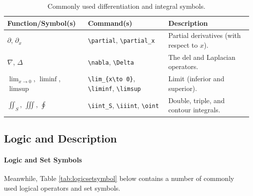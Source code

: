 \begin{table}[ht!]
\begin{tabularx}{\textwidth}{|p{}|>{\raggedright}p{}|X|}
\hline
Function/Symbol(s) & Command(s) & Description \\
\hline
$\partial$, $\partial_x$ & \texttt{\textbackslash partial}, \texttt{\textbackslash partial\_x} & Partial derivatives (with respect to $x$). \\
\hline
$\nabla$, $\Delta$ & \texttt{\textbackslash nabla}, \texttt{\textbackslash Delta} & The del and Laplacian operators. \\
\hline
$\lim_{x\to 0}$, $\liminf$, $\limsup$ & \texttt{\textbackslash lim\_\{x\textbackslash to 0\}}, \texttt{\textbackslash liminf}, \texttt{\textbackslash limsup} & Limit (inferior and superior). \\
\hline
$\iint_S$, $\iiint$, $\oint$ & \texttt{\textbackslash iint\_S}, \texttt{\textbackslash iiint}, \texttt{\textbackslash oint} & Double, triple\footnotemark, and contour integrals. \\
\hline
\end{tabularx}
\caption{Commonly used differentiation and integral symbols.}
\label{tab:deintsymbol}
\end{table}

\subsection{Logic and Description}

\paragraph{Logic and Set Symbols}
Meanwhile, Table \ref{tab:logicsetsymbol} below contains a number of commonly used logical operators and set symbols.

